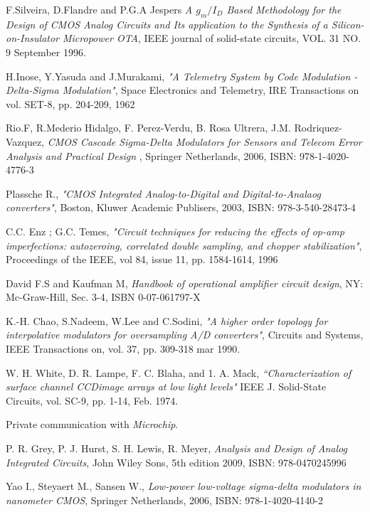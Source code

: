 \begin{thebibliography}{9}
F.Silveira, D.Flandre and P.G.A Jespers
\textit{A $g_m/I_D$ Based Methodology for the Design of CMOS Analog Circuits and Its application to the Synthesis of a Silicon-on-Insulator Micropower OTA},
IEEE journal of solid-state circuits, VOL. 31 NO. 9 September 1996.


H.Inose, Y.Yasuda and J.Murakami,
\textit{"A Telemetry System by Code Modulation - Delta-Sigma Modulation"},
Space Electronics and Telemetry,
IRE Transactions on vol.
SET-8, pp. 204-209,
1962

Rio.F, R.Mederio Hidalgo, F. Perez-Verdu, B. Rosa Ultrera, J.M. Rodriquez-Vazquez,
\textit{CMOS Cascade Sigma-Delta Modulators for Sensors and Telecom Error Analysis and Practical Design },
Springer Netherlands, 2006,
ISBN: 978-1-4020-4776-3

Plassche R., 
\textit{"CMOS Integrated Analog-to-Digital and Digital-to-Analaog converters"},
Boston, Kluwer Academic Publisers, 2003,
ISBN: 978-3-540-28473-4

 C.C. Enz ; G.C. Temes,
 \textit{"Circuit techniques for reducing the effects of op-amp imperfections: autozeroing, correlated double sampling, and chopper stabilization"},
 Proceedings of the IEEE,
 vol 84, issue 11,
 pp. 1584-1614,
 1996

David F.S and Kaufman M, 
\textit{Handbook of operational amplifier circuit design},
NY: Mc-Graw-Hill,
Sec. 3-4, 
ISBN 0-07-061797-X

K.-H. Chao, S.Nadeem, W.Lee and C.Sodini, 
\textit{"A higher order topology for interpolative modulators for oversampling A/D converters"},
Circuits and Systems, IEEE Transactions on, vol. 37, pp. 309-318 mar 1990.

W. H. White, D. R. Lampe, F. C. Blaha, and 1. A. Mack, \textit{“Characterization
of surface channel CCDimage arrays at low light levels"}
IEEE J. Solid-State Circuits, vol. SC-9, pp. 1-14, Feb. 1974.

Private communication with \textit{Microchip}.

P. R. Grey, P. J. Hurst, S. H. Lewis, R. Meyer,
\textit{Analysis and Design of Analog Integrated Circuits},
John Wiley Sons, 5th edition 2009,
ISBN: 978-0470245996


Yao I., Steyaert M., Sansen W., 
\textit{Low-power low-voltage sigma-delta modulators in nanometer CMOS},
Springer Netherlands, 2006,
ISBN: 978-1-4020-4140-2


\end{thebibliography}
